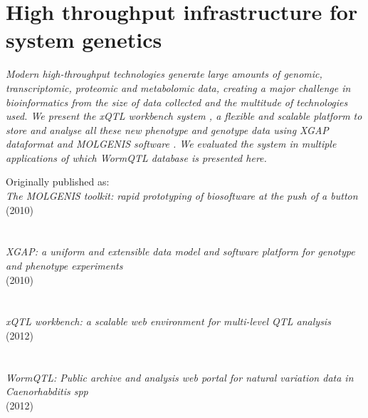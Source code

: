 \chapter{High throughput infrastructure for system genetics}
\thispagestyle{empty}
\label{chap:xqtlwormbench}

\emph{Modern high-throughput technologies generate large amounts of genomic, transcriptomic, 
proteomic and metabolomic data, creating a major challenge in bioinformatics from the size 
of data collected and the multitude of technologies used. We present the xQTL workbench 
system \cite{Arends:2012}, a flexible and scalable platform to store and analyse all these 
new phenotype and genotype data using XGAP \cite{Swertz:2010a} dataformat and MOLGENIS software 
\cite{Swertz:2004}. We evaluated the system in multiple applications of which WormQTL database 
\cite{Snoek:2012} is presented here.}

\null
\vfill

\begin{myexampleblock}{Originally published as:}
  \\
  \emph{The MOLGENIS toolkit: rapid prototyping of biosoftware at the push of a button}\\
   (2010)\\\\

  \\
  \emph{XGAP: a uniform and extensible data model and software platform for genotype and phenotype experiments}\\
   (2010)\\\\

  \\
  \emph{xQTL workbench: a scalable web environment for multi-level QTL analysis}\\
   (2012)\\\\

  \\
  \emph{WormQTL: Public archive and analysis web portal for natural variation data in Caenorhabditis spp}\\
   (2012)
\end{myexampleblock}

